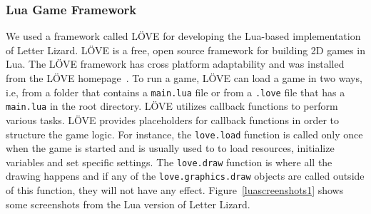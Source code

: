 \subsubsection{Lua Game Framework}
We used a framework called L\"OVE for developing the Lua-based implementation of Letter Lizard. L\"OVE is a free, open source framework for building 2D games in Lua. The L\"OVE framework has cross platform adaptability and was installed from the L\"OVE homepage~\cite{about_love}. To run a game, L\"OVE can load a game in two ways, i.e, from a folder that contains a \texttt{main.lua} file or from a \texttt{.love} file that has a \texttt{main.lua} in the root directory. L\"OVE utilizes callback functions to perform various tasks. L\"OVE provides placeholders for callback functions in order to structure the game logic. For instance, the \texttt{love.load} function is called only once when the game is started and is usually used to to load resources, initialize variables and set specific settings. The \texttt{love.draw} function is where all the drawing happens and if any of the \texttt{love.graphics.draw} objects are called outside of this function, they will not have any effect. Figure~\ref{luascreenshots1} shows some screenshots from the Lua version of Letter Lizard.

